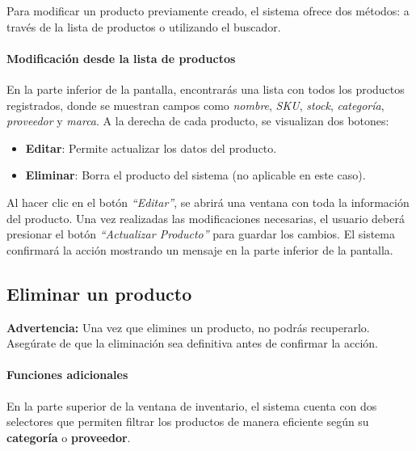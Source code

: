 \begin{justify}
Para modificar un producto previamente creado, el sistema ofrece dos métodos: a través de la lista de productos o utilizando el buscador.
\end{justify}

\paragraph{Modificación desde la lista de productos}
\begin{justify}
En la parte inferior de la pantalla, encontrarás una lista con todos los productos registrados, donde se muestran campos como \emph{nombre}, \emph{SKU}, \emph{stock}, \emph{categoría}, \emph{proveedor} y \emph{marca}.  
A la derecha de cada producto, se visualizan dos botones:
\end{justify}


\begin{itemize}
  \item \textbf{Editar}: Permite actualizar los datos del producto.
  \item \textbf{Eliminar}: Borra el producto del sistema (no aplicable en este caso).
\end{itemize}


\begin{justify}
Al hacer clic en el botón \emph{“Editar”}, se abrirá una ventana con toda la información del producto.  
Una vez realizadas las modificaciones necesarias, el usuario deberá presionar el botón \emph{“Actualizar Producto”} para guardar los cambios.  
El sistema confirmará la acción mostrando un mensaje en la parte inferior de la pantalla.
\end{justify}

\subsection{Eliminar un producto}

\begin{justify}
\textbf{Advertencia:} Una vez que elimines un producto, no podrás recuperarlo. Asegúrate de que la eliminación sea definitiva antes de confirmar la acción.
\end{justify}

\paragraph{Funciones adicionales}
\begin{justify}
En la parte superior de la ventana de inventario, el sistema cuenta con dos selectores que permiten filtrar los productos de manera eficiente según su \textbf{categoría} o \textbf{proveedor}.
\end{justify}

